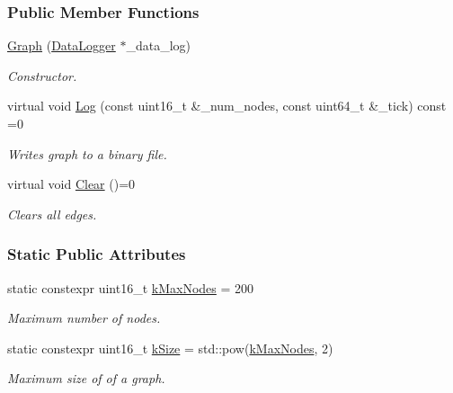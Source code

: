 \subsubsection*{Public Member Functions}
\begin{DoxyCompactItemize}
\item 
\hyperlink{classosse_1_1collaborate_1_1_graph_aa6e69d08b74393ecfa68cbf915d7eabc}{Graph} (\hyperlink{classosse_1_1collaborate_1_1_data_logger}{Data\+Logger} $\ast$\+\_\+data\+\_\+log)
\begin{DoxyCompactList}\small\item\em Constructor. \end{DoxyCompactList}\item 
virtual void \hyperlink{classosse_1_1collaborate_1_1_graph_abaef7c4642242e096d2bbfc74b8d1d07}{Log} (const uint16\+\_\+t \&\+\_\+num\+\_\+nodes, const uint64\+\_\+t \&\+\_\+tick) const =0
\begin{DoxyCompactList}\small\item\em Writes graph to a binary file. \end{DoxyCompactList}\item 
\mbox{\label{classosse_1_1collaborate_1_1_graph_a92b99db1a453e58d1fb3fc134a8fd8ba}} 
virtual void \hyperlink{classosse_1_1collaborate_1_1_graph_a92b99db1a453e58d1fb3fc134a8fd8ba}{Clear} ()=0
\begin{DoxyCompactList}\small\item\em Clears all edges. \end{DoxyCompactList}\end{DoxyCompactItemize}
\subsubsection*{Static Public Attributes}
\begin{DoxyCompactItemize}
\item 
\mbox{\label{classosse_1_1collaborate_1_1_graph_a063285c7a14ce7499b355cac87d1900a}} 
static constexpr uint16\+\_\+t \hyperlink{classosse_1_1collaborate_1_1_graph_a063285c7a14ce7499b355cac87d1900a}{k\+Max\+Nodes} = 200
\begin{DoxyCompactList}\small\item\em Maximum number of nodes. \end{DoxyCompactList}\item 
\mbox{\label{classosse_1_1collaborate_1_1_graph_a9c9828305d419d29fc1eed87a4520cd5}} 
static constexpr uint16\+\_\+t \hyperlink{classosse_1_1collaborate_1_1_graph_a9c9828305d419d29fc1eed87a4520cd5}{k\+Size} = std\+::pow(\hyperlink{classosse_1_1collaborate_1_1_graph_a063285c7a14ce7499b355cac87d1900a}{k\+Max\+Nodes}, 2)
\begin{DoxyCompactList}\small\item\em Maximum size of of a graph. \end{DoxyCompactList}\end{DoxyCompactItemize}
